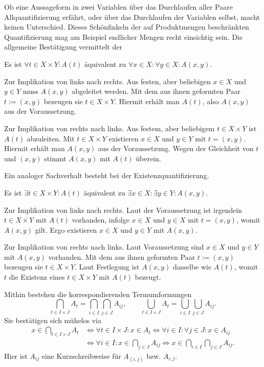 \noindent
Ob eine Aussageform in zwei Variablen über das Durchlaufen aller Paare
Allquantifizierung erfährt, oder über das Durchlaufen der Variablen
selbst, macht keinen Unterschied. Dieses Schönfinkeln der auf
Produktmengen beschränkten Quantifizierung mag am Beispiel endlicher
Mengen recht einsichtig sein. Die allgemeine Bestätigung vermittelt der

\begin{Satz}
Es ist $\forall t\in X\times Y\colon A(t)$
äquivalent zu $\forall x\in X\colon\forall y\in X\colon A(x,y)$.
\end{Satz}
\begin{Beweis}
Zur Implikation von links nach rechts. Aus festen, aber beliebigen
$x\in X$ und $y\in Y$ muss $A(x,y)$ abgeleitet werden. Mit dem aus ihnen geformten
Paar $t:=(x,y)$ bezeugen sie $t\in X\times Y$. Hiermit erhält man $A(t)$,
also $A(x,y)$ aus der Voraussetzung.

Zur Implikation von rechts nach links. Aus festem, aber beliebigem
$t\in X\times Y$ ist $A(t)$ abzuleiten. Mit $t\in X\times Y$ existieren
$x\in X$ und $y\in Y$ mit $t=(x,y)$. Hiermit erhält man $A(x,y)$ aus
der Voraussetzung. Wegen der Gleichheit von $t$ und $(x,y)$ stimmt
$A(x,y)$ mit $A(t)$ überein.\,\qedsymbol
\end{Beweis}

\noindent
Ein analoger Sachverhalt besteht bei der Existenzquantifizierung.

\begin{Satz}
Es ist $\exists t\in X\times Y\colon A(t)$ äquivalent zu
$\exists x\in X\colon\exists y\in Y\colon A(x,y)$.
\end{Satz}
\begin{Beweis}
Zur Implikation von links nach rechts. Laut der Voraussetzung ist
irgendein $t\in X\times Y$ mit $A(t)$ vorhanden, infolge $x\in X$ und $y\in X$
mit $t=(x,y)$, womit $A(x,y)$ gilt. Ergo existieren $x\in X$ und
$y\in Y$ mit $A(x,y)$.

Zur Implikation von rechts nach links. Laut Voraussetzung sind $x\in X$
und $y\in Y$ mit $A(x,y)$ vorhanden. Mit dem aus ihnen geformten
Paar $t:=(x,y)$ bezeugen sie $t\in X\times Y$. Laut Festlegung ist
$A(x,y)$ dasselbe wie $A(t)$, womit $t$ die Existenz eines
$t\in X\times Y$ mit $A(t)$ bezeugt.\,\qedsymbol
\end{Beweis}

\noindent
Mithin bestehen die korrespondierenden Termumformungen
\[\bigcap_{t\in I\times J} A_t = \bigcap_{i\in I}\bigcap_{j\in J} A_{ij},\qquad
\bigcup_{t\in I\times J} A_t = \bigcup_{i\in I}\bigcup_{j\in J} A_{ij}.\]
Sie bestätigen sich mühelos via
\begin{align*}\textstyle
x\in\bigcap_{t\in I\times J} A_t &\iff
\forall t\in I\times J\colon x\in A_t
\iff\forall i\in I\colon\forall j\in J\colon x\in A_{ij}\\
&\textstyle\iff\forall i\in I\colon x\in\bigcap_{j\in J} A_{ij}
\iff x\in\bigcap_{i\in I}\bigcap_{j\in J} A_{ij}.
\end{align*}
Hier ist $A_{ij}$ eine Kurzschreibweise für $A_{(i,j)}$
bzw. $A_{i,j}$.

